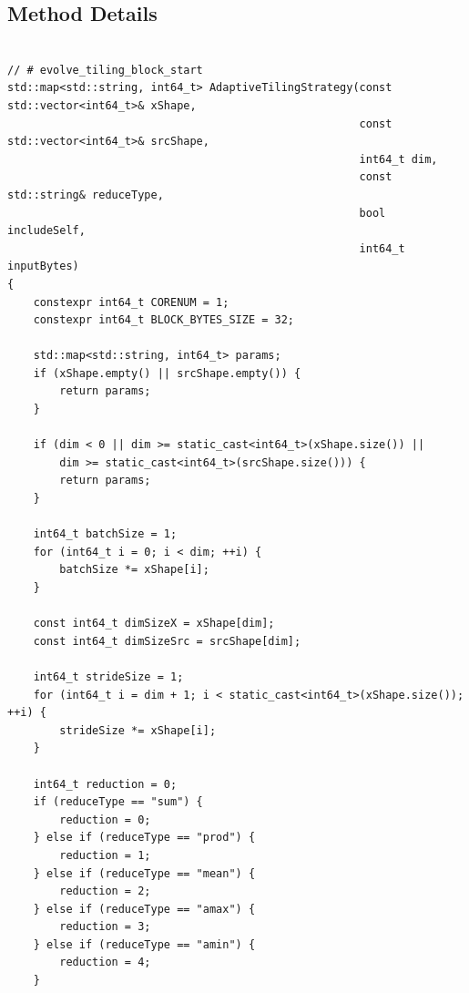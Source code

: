 \documentclass{article}
\theoremstyle{plain}
\theoremstyle{definition}
\theoremstyle{remark}
\begin{document}


\subsection{Method Details}\label{app:methodDet}
\begin{tcolorbox}[
  enhanced,
  breakable,
  colback=white,
  colframe=black!30,
  boxrule=0.3pt,
  arc=1.2pt,
  left=0.5em,right=0.5em,top=0.5em,bottom=0.5em,
  title={Method details: base tiling function $\mathcal{T}_{\text{base}}$},
  fonttitle=\bfseries,
]
\lstset{style=appendixcode}
\begin{lstlisting}

// # evolve_tiling_block_start
std::map<std::string, int64_t> AdaptiveTilingStrategy(const std::vector<int64_t>& xShape,
                                                      const std::vector<int64_t>& srcShape,
                                                      int64_t dim,
                                                      const std::string& reduceType,
                                                      bool includeSelf,
                                                      int64_t inputBytes)
{
    constexpr int64_t CORENUM = 1;
    constexpr int64_t BLOCK_BYTES_SIZE = 32;

    std::map<std::string, int64_t> params;
    if (xShape.empty() || srcShape.empty()) {
        return params;
    }

    if (dim < 0 || dim >= static_cast<int64_t>(xShape.size()) ||
        dim >= static_cast<int64_t>(srcShape.size())) {
        return params;
    }

    int64_t batchSize = 1;
    for (int64_t i = 0; i < dim; ++i) {
        batchSize *= xShape[i];
    }

    const int64_t dimSizeX = xShape[dim];
    const int64_t dimSizeSrc = srcShape[dim];

    int64_t strideSize = 1;
    for (int64_t i = dim + 1; i < static_cast<int64_t>(xShape.size()); ++i) {
        strideSize *= xShape[i];
    }

    int64_t reduction = 0;
    if (reduceType == "sum") {
        reduction = 0;
    } else if (reduceType == "prod") {
        reduction = 1;
    } else if (reduceType == "mean") {
        reduction = 2;
    } else if (reduceType == "amax") {
        reduction = 3;
    } else if (reduceType == "amin") {
        reduction = 4;
    }


\end{lstlisting}
\end{tcolorbox}
\end{document}
